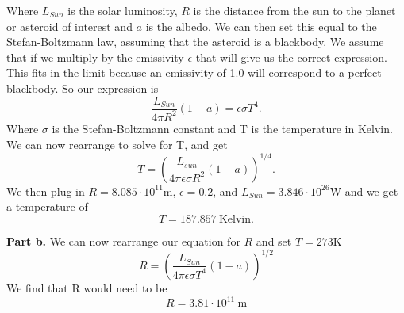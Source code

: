\documentclass[12pt, leqno]{article}
\begin{document}
\noindent Where $L_{Sun}$ is the solar luminosity, $R$ is the distance from the sun to the planet or asteroid of interest and $a$ is the albedo. We can then set this equal to the Stefan-Boltzmann law, assuming that the asteroid is a blackbody. We assume that if we multiply by the emissivity $\epsilon$ that will give us the correct expression. This fits in the limit because an emissivity of 1.0 will correspond to a perfect blackbody. So our expression is 
$$
\frac{L_{Sun}}{4 \pi R^2} (1-a) = \epsilon \sigma T^4 .
$$
Where $\sigma$ is the Stefan-Boltzmann constant and T is the temperature in Kelvin. We can now rearrange to solve for T, and get 
$$ 
T = \left(\frac{L_{sun}}{4 \pi \epsilon \sigma R^2 }(1-a)\right)^{1/4} .
$$
We then plug in $R=8.085\cdot10^{11}$m, $\epsilon=0.2$, and $L_{Sun}=3.846\cdot10^{26}$W and we get a temperature of 
$$ 
T = 187.857 \ \mathrm{Kelvin} .
$$

\noindent \textbf{Part b.}
We can now rearrange our equation for $R$ and set $T=273\mathrm{K}$
$$
R = \left(\frac{L_{Sun}}{4 \pi \epsilon \sigma T^4}(1-a)\right)^{1/2}
$$
We find that R would need to be 
$$
R = 3.81\cdot10^{11} \ \mathrm{m}
$$
\end{document}

